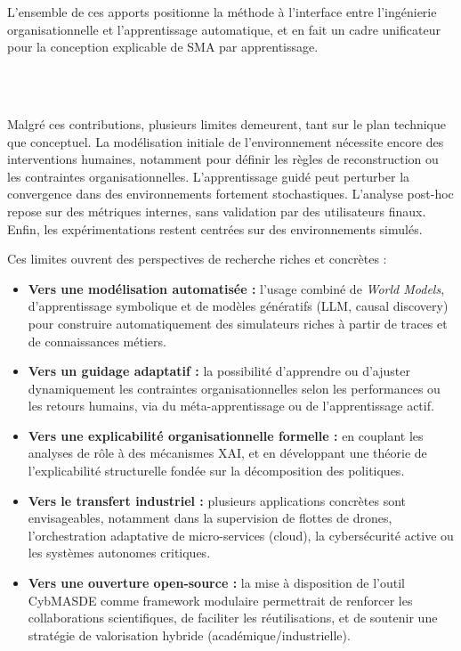 L’ensemble de ces apports positionne la méthode à l’interface entre l’ingénierie organisationnelle et l’apprentissage automatique, et en fait un cadre unificateur pour la conception explicable de SMA par apprentissage.


\

\bigskip

\\

\noindent
Malgré ces contributions, plusieurs limites demeurent, tant sur le plan technique que conceptuel. La modélisation initiale de l’environnement nécessite encore des interventions humaines, notamment pour définir les règles de reconstruction ou les contraintes organisationnelles. L’apprentissage guidé peut perturber la convergence dans des environnements fortement stochastiques. L’analyse post-hoc repose sur des métriques internes, sans validation par des utilisateurs finaux. Enfin, les expérimentations restent centrées sur des environnements simulés.

Ces limites ouvrent des perspectives de recherche riches et concrètes :

\begin{itemize}
  \item \textbf{Vers une modélisation automatisée :} l’usage combiné de \textit{World Models}, d’apprentissage symbolique et de modèles génératifs (LLM, causal discovery) pour construire automatiquement des simulateurs riches à partir de traces et de connaissances métiers.

  \item \textbf{Vers un guidage adaptatif :} la possibilité d’apprendre ou d’ajuster dynamiquement les contraintes organisationnelles selon les performances ou les retours humains, via du méta-apprentissage ou de l’apprentissage actif.

  \item \textbf{Vers une explicabilité organisationnelle formelle :} en couplant les analyses de rôle à des mécanismes XAI, et en développant une théorie de l’explicabilité structurelle fondée sur la décomposition des politiques.

  \item \textbf{Vers le transfert industriel :} plusieurs applications concrètes sont envisageables, notamment dans la supervision de flottes de drones, l’orchestration adaptative de micro-services (cloud), la cybersécurité active ou les systèmes autonomes critiques.

  \item \textbf{Vers une ouverture open-source :} la mise à disposition de l’outil CybMASDE comme framework modulaire permettrait de renforcer les collaborations scientifiques, de faciliter les réutilisations, et de soutenir une stratégie de valorisation hybride (académique/industrielle).
\end{itemize}

